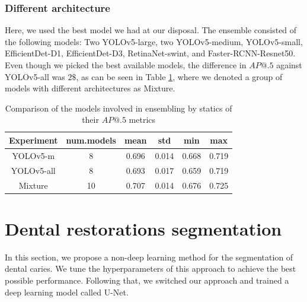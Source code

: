 \subsubsection{Different architecture}
Here, we used the best model we had at our disposal. The ensemble consisted of the following models: Two YOLOv5-large, two YOLOv5-medium, YOLOv5-small, EfficientDet-D1, EfficientDet-D3, RetinaNet-swint, and Faster-RCNN-Resnet50. Even though we picked the best available models, the difference in $AP@.5$ against YOLOv5-all was $2\$$, as can be seen in Table \ref{tab:ensemble_models_involved}, where we denoted a group of models with different architectures as Mixture.

\begin{table}[h]
    \centering
    \begin{tabular}{|c|c|c|c|c|c|}
        \hline
        Experiment & num.models & mean  & std   & min   & max   \\ \hline
        YOLOv5-m   & 8          & 0.696 & 0.014 & 0.668 & 0.719 \\ \hline
        YOLOv5-all & 8          & 0.693 & 0.017 & 0.659 & 0.719 \\ \hline
        Mixture        & 10         & 0.707 & 0.014 & 0.676 & 0.725 \\ \hline
    \end{tabular}
    \caption{Comparison of the models involved in ensembling by statics of their $AP@.5$ metrics}
    \label{tab:ensemble_models_involved}
\end{table}

\section{Dental restorations segmentation}
\label{sec:methods:dental_restorations}
In this section, we propose a non-deep learning method for the segmentation of dental caries. We tune the hyperparameters of this approach to achieve the best possible performance. Following that, we switched our approach and trained a deep learning model called U-Net.
